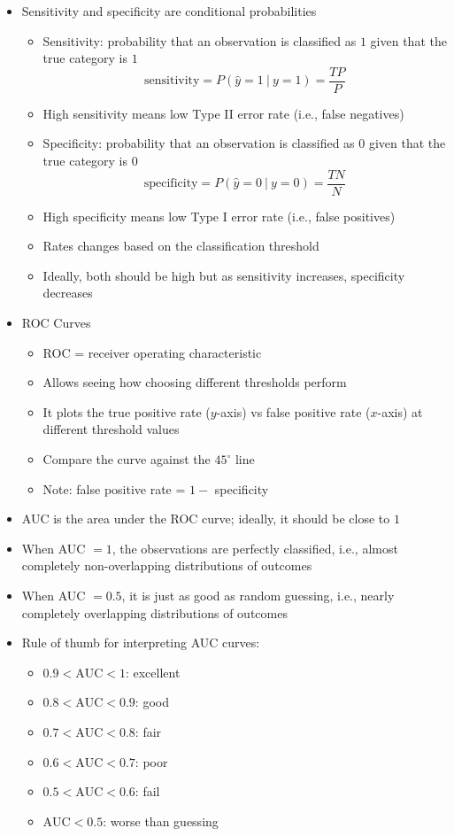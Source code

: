 \documentclass[12pt]{article}
\begin{document}
\begin{itemize}
\item Sensitivity and specificity are conditional probabilities \begin{itemize}
\item Sensitivity: probability that an observation is classified as $1$ given that the true category is $1$ 
$$ \text{sensitivity} = P(\hat{y} = 1 ~|~ y= 1) = \frac{TP}{P} $$ 
\item High sensitivity means low Type II error rate (i.e., false negatives) 
\item Specificity: probability that an observation is classified as $0$ given that the true category is $0$
$$ \text{specificity} = P(\hat{y} = 0 ~|~ y = 0) = \frac{TN}{N} $$ 
\item High specificity means low Type I error rate (i.e., false positives) 
\item Rates changes based on the classification threshold 
\item Ideally, both should be high but as sensitivity increases, specificity decreases \end{itemize} 
\item ROC Curves \begin{itemize} 
\item ROC = receiver operating characteristic 
\item Allows seeing how choosing different thresholds perform 
\item It plots the true positive rate ($y$-axis) vs false positive rate ($x$-axis) at different threshold values 
\item Compare the curve against the $45^\circ$ line 
\item Note: false positive rate = $1 - $ specificity \end{itemize} 
\item AUC is the area under the ROC curve; ideally, it should be close to $1$ 
\item When AUC $=1$, the observations are perfectly classified, i.e., almost completely non-overlapping distributions of outcomes
\item When AUC $=0.5$, it is just as good as random guessing, i.e., nearly completely overlapping distributions of outcomes 
\item Rule of thumb for interpreting AUC curves: \begin{itemize} 
\item $0.9 < \text{AUC} < 1$: excellent 
\item $0.8 < \text{AUC}  < 0.9$: good 
\item $0.7 < \text{AUC}  < 0.8$: fair
\item $0.6 < \text{AUC}  < 0.7$: poor 
\item $0.5 < \text{AUC}  < 0.6$: fail 
\item $\text{AUC}  < 0.5$: worse than guessing \end{itemize} 
\end{itemize}
\end{document}
